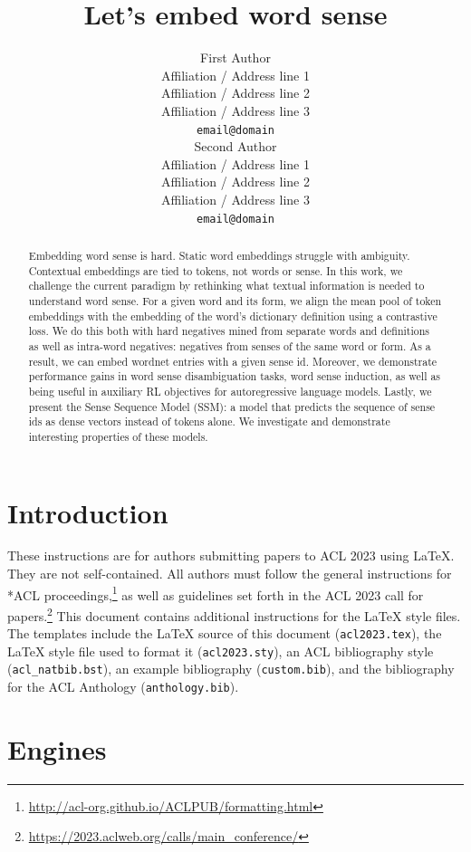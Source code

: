 \documentclass[11pt]{article}
\title{Let's embed word sense}
\author{First Author \\
  Affiliation / Address line 1 \\
  Affiliation / Address line 2 \\
  Affiliation / Address line 3 \\
  \texttt{email@domain} \\\And
  Second Author \\
  Affiliation / Address line 1 \\
  Affiliation / Address line 2 \\
  Affiliation / Address line 3 \\
  \texttt{email@domain} \\}
\begin{document}
\maketitle
\begin{abstract}
Embedding word sense is hard.
Static word embeddings struggle with ambiguity.
Contextual embeddings are tied to tokens, not words or sense.
In this work, we challenge the current paradigm by rethinking what textual information is needed to understand word sense. 
For a given word and its form, we align the mean pool of token embeddings with the embedding of the word's dictionary definition using a contrastive loss. We do this both with hard negatives mined from separate words and definitions as well as intra-word negatives: negatives from senses of the same word or form. 
As a result, we can embed wordnet entries with a given sense id. Moreover, we demonstrate performance gains in word sense disambiguation tasks, word sense induction, as well as being useful in auxiliary RL objectives for autoregressive language models.
Lastly, we present the Sense Sequence Model (SSM): a model that predicts the sequence of sense ids as dense vectors instead of tokens alone. We investigate and demonstrate interesting properties of these models.
\end{abstract}

\section{Introduction}

These instructions are for authors submitting papers to ACL 2023 using \LaTeX. They are not self-contained. All authors must follow the general instructions for *ACL proceedings,\footnote{\url{http://acl-org.github.io/ACLPUB/formatting.html}} as well as guidelines set forth in the ACL 2023 call for papers.\footnote{\url{https://2023.aclweb.org/calls/main_conference/}} This document contains additional instructions for the \LaTeX{} style files.
The templates include the \LaTeX{} source of this document (\texttt{acl2023.tex}),
the \LaTeX{} style file used to format it (\texttt{acl2023.sty}),
an ACL bibliography style (\texttt{acl\_natbib.bst}),
an example bibliography (\texttt{custom.bib}),
and the bibliography for the ACL Anthology (\texttt{anthology.bib}).

\section{Engines}
\end{document}
